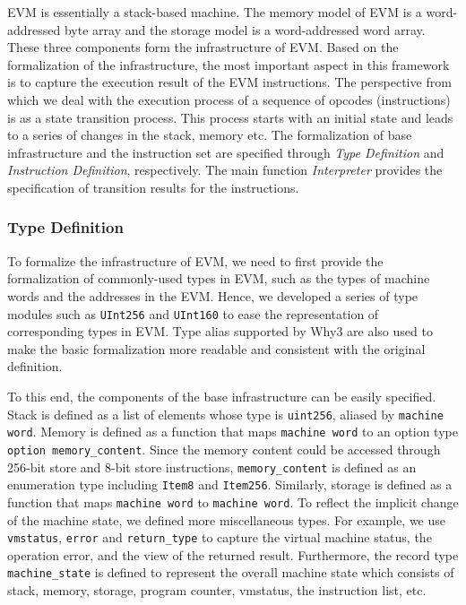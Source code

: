 \documentclass[runningheads]{llncs}
\begin{document}
EVM is essentially a stack-based machine. The memory model of EVM is a word-addressed byte array and
the storage model is a word-addressed word array. These three components form the infrastructure of EVM. 
Based on the formalization of the infrastructure, the most important aspect in this framework is to capture the execution result of the EVM instructions. 
The perspective from which we deal with the execution process of a sequence of opcodes (instructions) is as a state transition process. 
This process starts with an initial state and leads to a series of changes in the stack, memory etc. 
The formalization of base infrastructure and the instruction set are specified through \textit{Type Definition} and \textit{Instruction Definition}, respectively. 
The main function \textit{Interpreter} provides the specification of transition results for the instructions.

\subsubsection{Type Definition}\label{sec:type}

To formalize the infrastructure of EVM, we need to first provide the formalization of commonly-used types in EVM, 
such as the types of machine words and the addresses in the EVM. 
Hence, we developed a series of type modules such as \texttt{UInt256} and \texttt{UInt160} to ease the representation of corresponding types in EVM. 
Type alias supported by Why3 are also used to make the basic formalization more readable and consistent with the original definition. 

To this end, the components of the base infrastructure can be easily specified. 
Stack is defined as a list of elements whose type is \texttt{uint256}, aliased by \texttt{machine word}. 
Memory is defined as a function that maps \texttt{machine word} to an option type \texttt{option memory\_content}. 
Since the memory content could be accessed through 256-bit store and 8-bit store instructions, 
\texttt{memory\_content} is defined as an enumeration type including \texttt{Item8} and \texttt{Item256}. 
Similarly, storage is defined as a function that maps \texttt{machine word} to \texttt{machine word}. 
To reflect the implicit change of the machine state, we defined more miscellaneous types. 
For example, we use \texttt{vmstatus}, \texttt{error} and \texttt{return\_type} to capture the virtual machine status, the operation error, 
and the view of the returned result. 
Furthermore, the record type \texttt{machine\_state} is defined to represent the overall machine state 
which consists of stack, memory, storage, program counter, vmstatus, the instruction list, etc.
\end{document}
